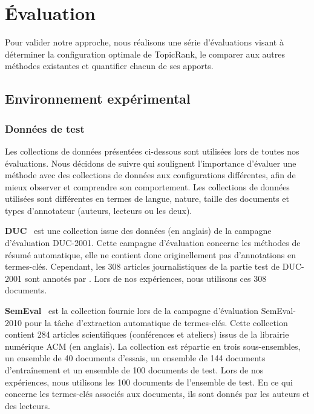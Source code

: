\section{Évaluation}
\label{sec:evaluation}
  Pour valider notre approche, nous réalisons une série d'évaluations visant à
  déterminer la configuration optimale de TopicRank, le comparer aux autres
  méthodes existantes et quantifier chacun de ses apports.

  \subsection{Environnement expérimental}
  \label{subsec:environnement_experimental}
    \subsubsection{Données de test}
    \label{subsubsec:donnees_de_test}
      Les collections de données présentées ci-dessous sont utilisées lors de
      toutes nos évaluations. Nous décidons de suivre
       qui soulignent l'importance d'évaluer une
      méthode avec des collections de données aux configurations différentes,
      afin de mieux observer et comprendre son comportement. Les collections de
      données utilisées sont différentes en termes de langue, nature, taille des
      documents et types d'annotateur (auteurs, lecteurs ou les deux).

      \textbf{DUC}~\cite{over2001duc} est une collection issue des données (en
      anglais) de la campagne d'évaluation DUC-2001. Cette campagne d'évaluation
      concerne les méthodes de résumé automatique, elle ne contient donc
      originellement pas d'annotations en termes-clés. Cependant, les 308
      articles journalistiques de la partie test de DUC-2001 sont annotés par
      . Lors de nos expériences, nous utilisons ces
      308 documents.

      \textbf{SemEval}~\cite{kim2010semeval} est la collection fournie lors de
      la campagne d'évaluation SemEval-2010 pour la tâche d'extraction
      automatique de termes-clés. Cette collection contient 284 articles
      scientifiques (conférences et ateliers) issus de la librairie numérique
      ACM (en anglais). La collection est répartie en trois sous-ensembles, un
      ensemble de 40 documents d'essais, un ensemble de 144 documents
      d'entraînement et un ensemble de 100 documents de test. Lors de nos
      expériences, nous utilisons les 100 documents de l'ensemble de test. En ce
      qui concerne les termes-clés associés aux documents, ils sont donnés par
      les auteurs et des lecteurs.

